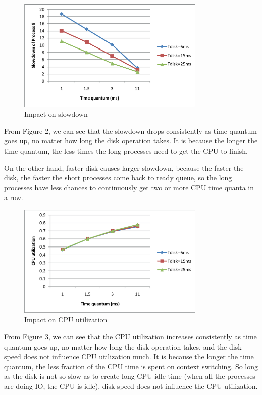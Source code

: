 \documentclass[12pt,letterpaper]{article}
\begin{document}
\begin{figure}[h]
\begin{center}
\includegraphics[width=0.8\textwidth]{slowdown.eps}
\caption{Impact on slowdown}
\end{center}
\end{figure}

From Figure 2, we can see that the slowdown drops consistently as time quantum goes up, no matter how long the disk operation takes. It is because the longer the time quantum, the less times the long processes need to get the CPU to finish. 

On the other hand, faster disk causes larger slowdown, because the faster the disk, the faster the short processes come back to ready queue, so the long processes have less chances to continuously get two or more CPU time quanta in a row.

\begin{figure}[h]
\begin{center}
\includegraphics[width=0.8\textwidth]{cpuUtil.eps}
\caption{Impact on CPU utilization}
\end{center}
\end{figure}

From Figure 3, we can see that the CPU utilization increases consistently as time quantum goes up, no matter how long the disk operation takes, and the disk speed does not influence CPU utilization much. It is because the longer the time quantum, the less fraction of the CPU time is spent on context switching. So long as the disk is not so slow as to create long CPU idle time (when all the processes are doing IO, the CPU is idle), disk speed does not influence the CPU utilization.
\end{document}
